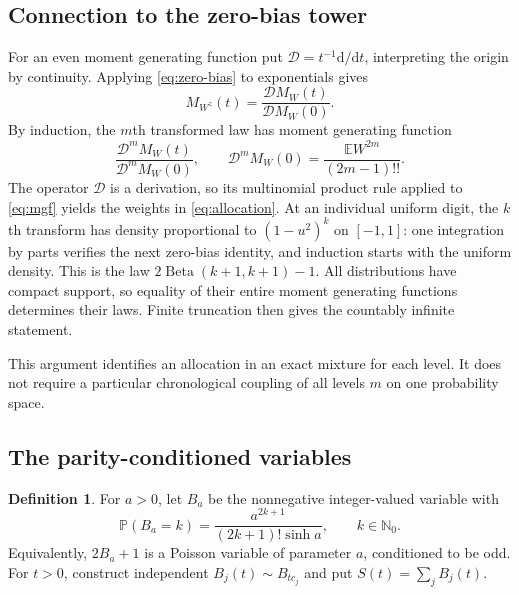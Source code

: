 \documentclass[11pt,a4paper]{article}
\numberwithin{equation}{section}
\theoremstyle{definition}
\newtheorem{definition}[theorem]{Definition}
\theoremstyle{remark}
\newcommand{\E}{\mathbb E}
\newcommand{\PP}{\mathbb P}
\newcommand{\N}{\mathbb N}
\begin{document}
\subsection{Connection to the zero-bias tower}
For an even moment generating function put
$\mathcal D=t^{-1}\mathrm d/\mathrm dt$, interpreting the origin by
continuity. Applying \cref{eq:zero-bias} to exponentials gives
\[
M_{W^z}(t)=\frac{\mathcal D M_W(t)}{\mathcal D M_W(0)}.
\]
By induction, the $m$th transformed law has moment generating function
\begin{equation}
\frac{\mathcal D^m M_W(t)}{\mathcal D^m M_W(0)},
\qquad
\mathcal D^m M_W(0)=\frac{\E W^{2m}}{(2m-1)!!}.
\label{eq:radial-derivative}
\end{equation}
The operator $\mathcal D$ is a derivation, so its multinomial product rule
applied to \cref{eq:mgf} yields the weights in
\cref{eq:allocation}. At an individual uniform digit, the $k$th transform
has density proportional to $(1-u^2)^k$ on $[-1,1]$: one integration by
parts verifies the next zero-bias identity, and induction starts with the
uniform density. This is the law $2\operatorname{Beta}(k+1,k+1)-1$.
All distributions have compact support, so equality of their entire moment
generating functions determines their laws. Finite truncation then gives
the countably infinite statement.

This argument identifies an allocation in an exact mixture for each
level. It does not require a particular chronological coupling of all
levels $m$ on one probability space.

\subsection{The parity-conditioned variables}
\begin{definition}
For $a>0$, let $B_a$ be the nonnegative integer-valued variable with
\begin{equation}
\PP(B_a=k)=\frac{a^{2k+1}}{(2k+1)!\sinh a},
\qquad k\in\N_0.
\label{eq:odd-poisson}
\end{equation}
Equivalently, $2B_a+1$ is a Poisson variable of parameter $a$, conditioned
to be odd. For $t>0$, construct independent $B_j(t)\sim B_{tc_j}$ and put
$S(t)=\sum_jB_j(t)$.
\end{definition}
\end{document}
